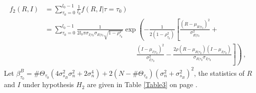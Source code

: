 \begin{equation}
  \begin{split}
	f_2(R, I) &= \sum_{\tau_0 = 0}^{l_0-1} \frac{1}{l_0}f(R, I|\tau=\tau_0)\\
	&= \sum_{\tau_0 = 0}^{l_0-1}\frac{1}{2l_0\pi\sigma_{I|\tau_0}\sigma_{R|\tau_0}\sqrt{1 - \rho_{\tau_0}^2}}\exp\left( -\frac{1}{2(1-\rho_{\tau_0}^2)}\left[ \frac{(R-\mu_{R|\tau_0})^2}{\sigma_{R|\tau_0}^2} + \right.\right.\\
	& \left. \left. \;\;\;\;\;\;\;\;\;\;\;\;\;\;\;\; \;\;\;\;\;\;\;\;\;\;\;\;\;\;\;\; \;\;\;\;\;\;\;\;\;\;\;\;\;\;\;\; \frac{(I-\mu_{I|\tau_0})^2}{\sigma_{I|\tau_0}^2} - \frac{2\rho(R-\mu_{R|\tau_0})(I-\mu_{I|\tau_0})}{\sigma_{R|\tau_0}\sigma_{I|\tau_0}}\right] \right)\,,
  \end{split}
  \label{f_1underH1}
\end{equation}
Let $\beta_{\tau_0}^B = \#\Theta_{\tau_0}(4\sigma_{s_B}^2\sigma_n^2+2\sigma_n^4) + 2(N - \#\Theta_{\tau_0})(\sigma_n^2+\sigma_{s_B}^2)^2$, 
the statistics of $R$ and $I$ under hypothesis $H_2$ are given in Table \ref{Table3} on page \pageref{Table3}. 

